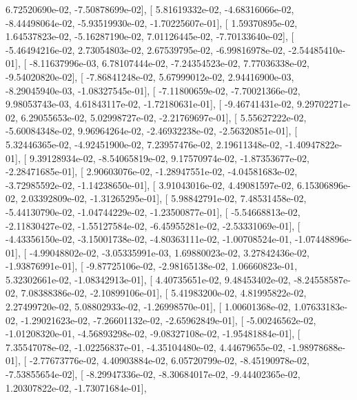 \documentclass{article}
\begin{document}
          6.72520690e-02,  -7.50878699e-02],
       [  5.81619332e-02,  -4.68316066e-02,  -8.44498064e-02,
         -5.93519930e-02,  -1.70225607e-01],
       [  1.59370895e-02,   1.64537823e-02,  -5.16287190e-02,
          7.01126445e-02,  -7.70133640e-02],
       [ -5.46494216e-02,   2.73054803e-02,   2.67539795e-02,
         -6.99816978e-02,  -2.54485410e-01],
       [ -8.11637996e-03,   6.78107444e-02,  -7.24354523e-02,
          7.77036338e-02,  -9.54020820e-02],
       [ -7.86841248e-02,   5.67999012e-02,   2.94416900e-03,
         -8.29045940e-03,  -1.08327545e-01],
       [ -7.11800659e-02,  -7.70021366e-02,   9.98053743e-03,
          4.61843117e-02,  -1.72180631e-01],
       [ -9.46741431e-02,   9.29702271e-02,   6.29055653e-02,
          5.02998727e-02,  -2.21769697e-01],
       [  5.55627222e-02,  -5.60084348e-02,   9.96964264e-02,
         -2.46932238e-02,  -2.56320851e-01],
       [  5.32446365e-02,  -4.92451900e-02,   7.23957476e-02,
          2.19611348e-02,  -1.40947822e-01],
       [  9.39128934e-02,  -8.54065819e-02,   9.17570974e-02,
         -1.87353677e-02,  -2.28471685e-01],
       [  2.90603076e-02,  -1.28947551e-02,  -4.04581683e-02,
         -3.72985592e-02,  -1.14238650e-01],
       [  3.91043016e-02,   4.49081597e-02,   6.15306896e-02,
          2.03392809e-02,  -1.31265295e-01],
       [  5.98842791e-02,   7.48531458e-02,  -5.44130790e-02,
         -1.04744229e-02,  -1.23500877e-01],
       [ -5.54668813e-02,  -2.11830427e-02,  -1.55127584e-02,
         -6.45955281e-02,  -2.53331069e-01],
       [ -4.43356150e-02,  -3.15001738e-02,  -4.80363111e-02,
         -1.00708524e-01,  -1.07448896e-01],
       [ -4.99048802e-02,  -3.05335991e-03,   1.69880023e-02,
          3.27842436e-02,  -1.93876991e-01],
       [ -9.87725106e-02,  -2.98165138e-02,   1.06660823e-01,
          5.32302661e-02,  -1.08342913e-01],
       [  4.40735651e-02,   9.48453402e-02,  -8.24558587e-02,
          7.08388386e-02,  -2.10899106e-01],
       [  5.41983200e-02,   4.81995822e-02,   2.27499720e-02,
          5.08802933e-02,  -1.26998570e-01],
       [  1.00601368e-02,   1.07633183e-02,  -1.29021623e-02,
         -7.26601132e-02,  -2.65962849e-01],
       [ -5.00246562e-02,  -1.01208320e-01,  -4.56893298e-02,
         -9.08327108e-02,  -1.95481884e-01],
       [  7.35547078e-02,  -1.02256837e-01,  -4.35104480e-02,
          4.44679655e-02,  -1.98978688e-01],
       [ -2.77673776e-02,   4.40903884e-02,   6.05720799e-02,
         -8.45190978e-02,  -7.53855654e-02],
       [ -8.29947336e-02,  -8.30684017e-02,  -9.44402365e-02,
          1.20307822e-02,  -1.73071684e-01],
\end{document}
